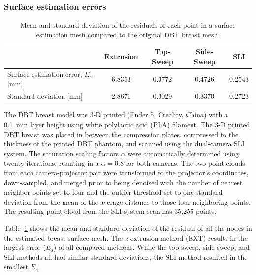 \subsubsection{Surface estimation errors}
\begin{table}
    \centering
    \caption{Mean and standard deviation of the residuals of each point in a surface estimation mesh compared to the original DBT breast mesh.}
        \begin{tabular}{lcccc}
        \toprule
         & Extrusion & Top-Sweep & Side-Sweep & SLI \\ \midrule
        Surface estimation error, $E_s$ [mm] & 6.8353 & 0.3772 & 0.4726 & \multicolumn{1}{l}{0.2543} \\
        Standard deviation [mm] & 2.8671 & 0.3029 & 0.3370 & 0.2723 \\ \bottomrule
        \end{tabular}%
    \label{tab:residuals}
\end{table}

The DBT breast model was 3-D printed (Ender 5, Creality, China) with a 0.1~mm layer height using white polylactic acid (PLA) filament. The 3-D printed DBT breast was placed in between the compression plates, compressed to the thickness of the printed DBT phantom, and scanned using the dual-camera SLI system. The saturation scaling factors $\alpha$ were automatically determined using twenty iterations, resulting in a $\alpha=0.8$ for both cameras. The two point-clouds from each camera-projector pair were transformed to the projector's coordinates, down-sampled, and merged prior to being denoised with the number of nearest neighbor points set to four and the outlier threshold set to one standard deviation from the mean of the average distance to those four neighboring points. The resulting point-cloud from the SLI system scan has 35,256 points.

Table~\ref{tab:residuals} shows the mean and standard deviation of the residual of all the nodes in the estimated breast surface mesh. The $z$-extrusion method (EXT) results in the largest error ($E_s$) of all compared methods. While the top-sweep, side-sweep, and SLI methods all had similar standard deviations, the SLI method resulted in the smallest $E_s$.

